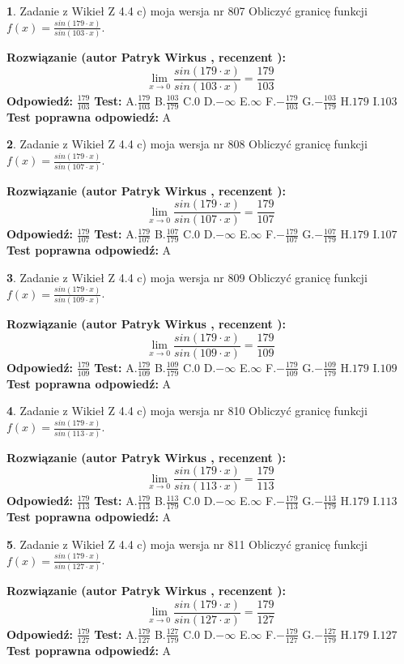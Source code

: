 \documentclass[12pt, a4paper]{article}
\theoremstyle{definition} %
\newtheorem{zad}{}
\newcommand{\zadStart}[1]{\begin{zad}#1\newline}
\newcommand{\zadStop}{\end{zad}}
\newcommand{\rozwStart}[2]{\noindent \textbf{Rozwiązanie (autor #1 , recenzent #2): }\newline}
\newcommand{\rozwStop}{\newline}
\newcommand{\odpStart}{\noindent \textbf{Odpowiedź:}\newline}
\newcommand{\odpStop}{\newline}
\newcommand{\testStart}{\noindent \textbf{Test:}\newline}
\newcommand{\testStop}{\newline}
\newcommand{\kluczStart}{\noindent \textbf{Test poprawna odpowiedź:}\newline}
\newcommand{\kluczStop}{\newline}
\begin{document}
\zadStart{Zadanie z Wikieł Z 4.4 c) moja wersja nr 807}
Obliczyć granicę funkcji $f(x)=\frac{sin(179\cdot x)}{sin(103\cdot x)}$.
\zadStop
\rozwStart{Patryk Wirkus}{}
$$\lim\limits_{x\to 0}\frac{sin(179\cdot x)}{sin(103\cdot x)}=
\frac{179}{103}$$
\rozwStop
\odpStart
$\frac{179}{103}$
\odpStop
\testStart
A.$\frac{179}{103}$
B.$\frac{103}{179}$
C.$0$
D.$-\infty$
E.$\infty$
F.$-\frac{179}{103}$
G.$-\frac{103}{179}$
H.$179$
I.$103$
\testStop
\kluczStart
A
\kluczStop



\zadStart{Zadanie z Wikieł Z 4.4 c) moja wersja nr 808}
Obliczyć granicę funkcji $f(x)=\frac{sin(179\cdot x)}{sin(107\cdot x)}$.
\zadStop
\rozwStart{Patryk Wirkus}{}
$$\lim\limits_{x\to 0}\frac{sin(179\cdot x)}{sin(107\cdot x)}=
\frac{179}{107}$$
\rozwStop
\odpStart
$\frac{179}{107}$
\odpStop
\testStart
A.$\frac{179}{107}$
B.$\frac{107}{179}$
C.$0$
D.$-\infty$
E.$\infty$
F.$-\frac{179}{107}$
G.$-\frac{107}{179}$
H.$179$
I.$107$
\testStop
\kluczStart
A
\kluczStop



\zadStart{Zadanie z Wikieł Z 4.4 c) moja wersja nr 809}
Obliczyć granicę funkcji $f(x)=\frac{sin(179\cdot x)}{sin(109\cdot x)}$.
\zadStop
\rozwStart{Patryk Wirkus}{}
$$\lim\limits_{x\to 0}\frac{sin(179\cdot x)}{sin(109\cdot x)}=
\frac{179}{109}$$
\rozwStop
\odpStart
$\frac{179}{109}$
\odpStop
\testStart
A.$\frac{179}{109}$
B.$\frac{109}{179}$
C.$0$
D.$-\infty$
E.$\infty$
F.$-\frac{179}{109}$
G.$-\frac{109}{179}$
H.$179$
I.$109$
\testStop
\kluczStart
A
\kluczStop



\zadStart{Zadanie z Wikieł Z 4.4 c) moja wersja nr 810}
Obliczyć granicę funkcji $f(x)=\frac{sin(179\cdot x)}{sin(113\cdot x)}$.
\zadStop
\rozwStart{Patryk Wirkus}{}
$$\lim\limits_{x\to 0}\frac{sin(179\cdot x)}{sin(113\cdot x)}=
\frac{179}{113}$$
\rozwStop
\odpStart
$\frac{179}{113}$
\odpStop
\testStart
A.$\frac{179}{113}$
B.$\frac{113}{179}$
C.$0$
D.$-\infty$
E.$\infty$
F.$-\frac{179}{113}$
G.$-\frac{113}{179}$
H.$179$
I.$113$
\testStop
\kluczStart
A
\kluczStop



\zadStart{Zadanie z Wikieł Z 4.4 c) moja wersja nr 811}
Obliczyć granicę funkcji $f(x)=\frac{sin(179\cdot x)}{sin(127\cdot x)}$.
\zadStop
\rozwStart{Patryk Wirkus}{}
$$\lim\limits_{x\to 0}\frac{sin(179\cdot x)}{sin(127\cdot x)}=
\frac{179}{127}$$
\rozwStop
\odpStart
$\frac{179}{127}$
\odpStop
\testStart
A.$\frac{179}{127}$
B.$\frac{127}{179}$
C.$0$
D.$-\infty$
E.$\infty$
F.$-\frac{179}{127}$
G.$-\frac{127}{179}$
H.$179$
I.$127$
\testStop
\kluczStart
A
\kluczStop
\end{document}
